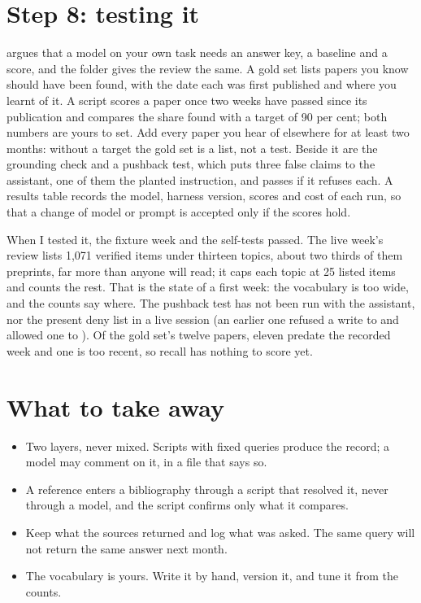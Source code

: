 \section{Step 8: testing it}

 argues that a model on your own task needs an answer key, a
baseline and a score, and the  folder gives the review the same.
A gold set lists papers you know should have been found, with the date each
was first published and where you learnt of it. A script scores a paper once
two weeks have passed since its publication and compares the share found
with a target of 90 per cent; both numbers are yours to set. Add every paper
you hear of elsewhere for at least two months: without a target the gold set
is a list, not a test. Beside it are the grounding check and a pushback test,
which puts three false claims to the assistant, one of them the planted
instruction, and passes if it refuses each. A results table records the
model, harness version, scores and cost of each run, so that a change of
model or prompt is accepted only if the scores hold.

When I tested it, the fixture week and the self-tests passed. The live week's
review lists 1,071 verified items under thirteen topics, about two thirds of
them preprints, far more than anyone will read; it caps each topic at 25
listed items and counts the rest. That is the state of a first week: the
vocabulary is too wide, and the counts say where. The pushback test has not
been run with the assistant, nor the present deny list in a live session (an
earlier one refused a write to  and allowed one to
). Of the gold set's twelve papers, eleven predate the recorded
week and one is too recent, so recall has nothing to score yet.

\section{What to take away}

\begin{itemize}
  \item Two layers, never mixed. Scripts with fixed queries produce the
    record; a model may comment on it, in a file that says so.
  \item A reference enters a bibliography through a script that resolved it,
    never through a model, and the script confirms only what it compares.
  \item Keep what the sources returned and log what was asked. The same query
    will not return the same answer next month.
  \item The vocabulary is yours. Write it by hand, version it, and tune it
    from the counts.
\end{itemize}

